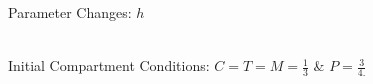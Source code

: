 \documentclass{beamer}
\begin{document}
\begin{frame}{Parameter Changes: $h$}
    \begin{center}
        \\
        Initial Compartment Conditions: $C=T=M=\frac{1}{3}$ \& $P=\frac{3}{4.}$
    \end{center}
\end{frame}

\end{document}
